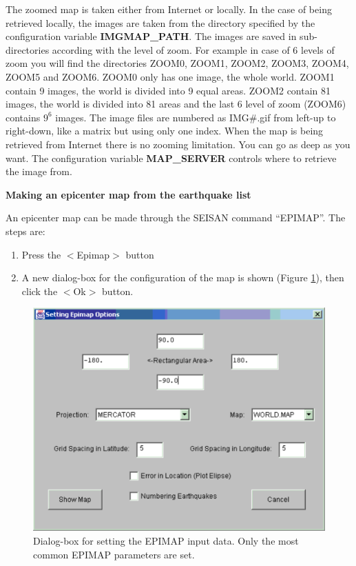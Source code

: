 The zoomed map is taken either from Internet or locally. In the case of being retrieved locally, the images are taken from the directory specified by the configuration variable \textbf{IMGMAP\_PATH}. The images are saved in sub-directories according with the level of zoom. For example in case of 6 levels of zoom you will find the directories ZOOM0, ZOOM1, ZOOM2, ZOOM3, ZOOM4, ZOOM5 and ZOOM6. ZOOM0 only has one image, the whole world. ZOOM1 contain 9 images, the world is divided into 9 equal areas. ZOOM2 contain 81 images, the world is divided into 81 areas and the last 
6
level of zoom (ZOOM6) contains $9^{6}$ images. The image files are numbered as IMG\#.gif from left-up to right-down, like a matrix but using only one index. When the map is being retrieved from Internet there is no zooming limitation. You can go as deep as you want. The configuration variable \textbf{MAP\_SERVER} controls where to retrieve the image from. 

\textbf{Making an epicenter map from the earthquake list}

An epicenter map can be made through the SEISAN command ``EPIMAP''. The steps are:   

\begin{enumerate}
\item Press the $<$Epimap$>$ button 
\item A new dialog-box for the configuration of the map is shown 
(Figure \ref{fig:jseisan-Dialog-box}), then click the  $<$Ok$>$ button. 
\end{enumerate}

\begin{figure}
\centerline{\includegraphics[width=0.9\linewidth]{fig/fig8}}
\caption{Dialog-box for setting the EPIMAP input data. Only the most common EPIMAP parameters are set.}
\label{fig:jseisan-Dialog-box}
\end{figure}

